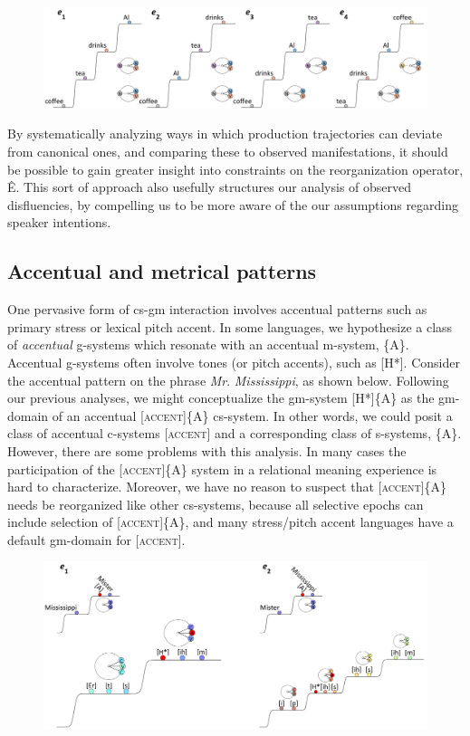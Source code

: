   
\begin{figure}
\includegraphics[width=\textwidth]{figures/Tilsen-img62.png}
\caption{\missingcaption}
\label{fig:4:12}
\end{figure}
 

  By systematically analyzing ways in which production trajectories can deviate from canonical ones, and comparing these to observed manifestations, it should be possible to gain greater insight into constraints on the reorganization operator, Ê. This sort of approach also usefully structures our analysis of observed disfluencies, by compelling us to be more aware of the our assumptions regarding speaker intentions.

\subsection{Accentual and metrical patterns}

One pervasive form of cs-gm interaction involves accentual patterns such as primary stress or lexical pitch accent. In some languages, we hypothesize a class of \textit{accentual} g-systems which resonate with an accentual m-system, \{A\}. Accentual g-systems often involve tones (or pitch accents), such as [H*]. Consider the accentual pattern on the phrase \textit{Mr}. \textit{Mississippi}, as shown below. Following our previous analyses, we might conceptualize the gm-system [H*]\{A\} as the gm-domain of an accentual [\textsc{accent}]\{A\} cs-system. In other words, we could posit a class of accentual c-systems [\textsc{accent}] and a corresponding class of s-systems, \{A\}. However, there are some problems with this analysis. In many cases the participation of the [\textsc{accent}]\{A\} system in a relational meaning experience is hard to characterize. Moreover, we have no reason to suspect that [\textsc{accent}]\{A\} needs be reorganized like other cs-systems, because all selective epochs can include selection of [\textsc{accent}]\{A\}, and many stress/pitch accent languages have a default gm-domain for [\textsc{accent}].

  
\begin{figure}
\includegraphics[width=\textwidth]{figures/Tilsen-img63.png}
\caption{\missingcaption}
\label{fig:4:13}
\end{figure}
 

